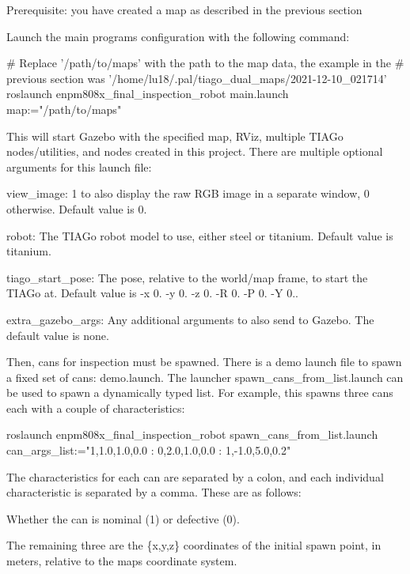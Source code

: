 Prerequisite\+: you have created a map as described in the previous section

Launch the main program\textquotesingle{}s configuration with the following command\+: 
\begin{DoxyCode}
# Replace '/path/to/maps' with the path to the map data, the example in the
# previous section was '/home/lu18/.pal/tiago\_dual\_maps/2021-12-10\_021714'
roslaunch enpm808x\_final\_inspection\_robot main.launch map:="/path/to/maps"
\end{DoxyCode}


This will start Gazebo with the specified map, R\+Viz, multiple T\+I\+A\+Go nodes/utilities, and nodes created in this project. There are multiple optional arguments for this launch file\+:
\begin{DoxyItemize}
\item view\+\_\+image\+: \textquotesingle{}1\textquotesingle{} to also display the raw R\+GB image in a separate window, \textquotesingle{}0\textquotesingle{} otherwise. Default value is \textquotesingle{}0\textquotesingle{}.
\item robot\+: The T\+I\+A\+Go robot model to use, either \textquotesingle{}steel\textquotesingle{} or \textquotesingle{}titanium\textquotesingle{}. Default value is \textquotesingle{}titanium\textquotesingle{}.
\item tiago\+\_\+start\+\_\+pose\+: The pose, relative to the world/map frame, to start the T\+I\+A\+Go at. Default value is \textquotesingle{}-\/x 0. -\/y 0. -\/z 0. -\/R 0. -\/P 0. -\/Y 0.\textquotesingle{}.
\item extra\+\_\+gazebo\+\_\+args\+: Any additional arguments to also send to Gazebo. The default value is none.
\end{DoxyItemize}

Then, cans for inspection must be spawned. There is a demo launch file to spawn a fixed set of cans\+: \textquotesingle{}demo.\+launch\textquotesingle{}. The launcher \textquotesingle{}spawn\+\_\+cans\+\_\+from\+\_\+list.\+launch\textquotesingle{} can be used to spawn a dynamically typed list. For example, this spawns three cans each with a couple of characteristics\+: 
\begin{DoxyCode}
roslaunch enpm808x\_final\_inspection\_robot spawn\_cans\_from\_list.launch can\_args\_list:="1,1.0,1.0,0.0 :
       0,2.0,1.0,0.0 : 1,-1.0,5.0,0.2"
\end{DoxyCode}


The characteristics for each can are separated by a colon, and each individual characteristic is separated by a comma. These are as follows\+:
\begin{DoxyItemize}
\item Whether the can is nominal (1) or defective (0).
\item The remaining three are the \{x,y,z\} coordinates of the initial spawn point, in meters, relative to the map\textquotesingle{}s coordinate system.
\end{DoxyItemize}

